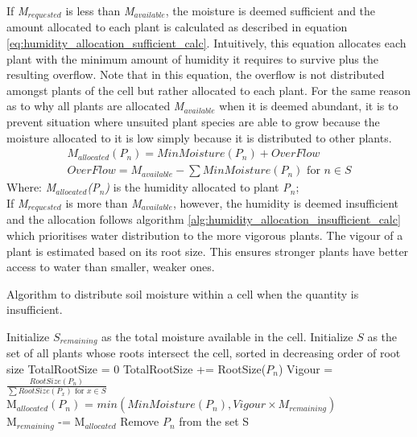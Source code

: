 If \textit{M$_{requested}$} is less than \textit{M$_{available}$}, the moisture is deemed sufficient and the amount allocated to each plant is calculated as described in equation \ref{eq:humidity_allocation_sufficient_calc}. Intuitively, this equation allocates each plant with the minimum amount of humidity it requires to survive plus the resulting overflow. Note that in this equation, the overflow is not distributed amongst plants of the cell but rather allocated to each plant. For the same reason as to why all plants are allocated \textit{M$_{available}$} when it is deemed abundant, it is to prevent situation where unsuited plant species are able to grow because the moisture allocated to it is low simply because it is distributed to other plants.\\

\begin{equation}
\begin{split}
M_{allocated}(P_{n}) = MinMoisture(P_{n}) + OverFlow \\
OverFlow = M_{available} - \sum MinMoisture(P_{n}) \text{ for } n \in S
\end{split}
\label{eq:humidity_allocation_sufficient_calc}
\end{equation}
Where: \textit{M$_{allocated}$(P$_{n}$)} is the humidity allocated to plant \textit{P$_{n}$};\\

If \textit{M$_{requested}$} is more than \textit{M$_{available}$}, however, the humidity is deemed insufficient and the allocation follows algorithm \ref{alg:humidity_allocation_insufficient_calc} which prioritises water distribution to the more vigorous plants. The vigour of a plant is estimated based on its root size. This ensures stronger plants have better access to water than smaller, weaker ones.\\

\begin{algorithm}
\caption{Algorithm to distribute soil moisture within a cell when the quantity is insufficient.}
\begin{algorithmic}[1]
\REQUIRE Initialize $S_{remaining}$ as the total moisture available in the cell.
\REQUIRE Initialize $S$ as the set of all plants whose roots intersect the cell, sorted in decreasing order of root size
\STATE TotalRootSize = 0
	\STATE TotalRootSize += RootSize($P_{n}$)
\ENDFOR
{}
	\STATE Vigour = $\frac{RootSize(P_{n})}{\sum RootSize(P_{x}) \text{ for } x \in S}$\\
	\STATE M$_{allocated}(P_{n})$ = $min(MinMoisture(P_{n}), Vigour \times M_{remaining})$ \\
	\STATE M$_{remaining}$ -= M$_{allocated}$
	\STATE Remove $P_{n}$ from the set S
\ENDFOR
\end{algorithmic}
\label{alg:humidity_allocation_insufficient_calc}
\end{algorithm}

